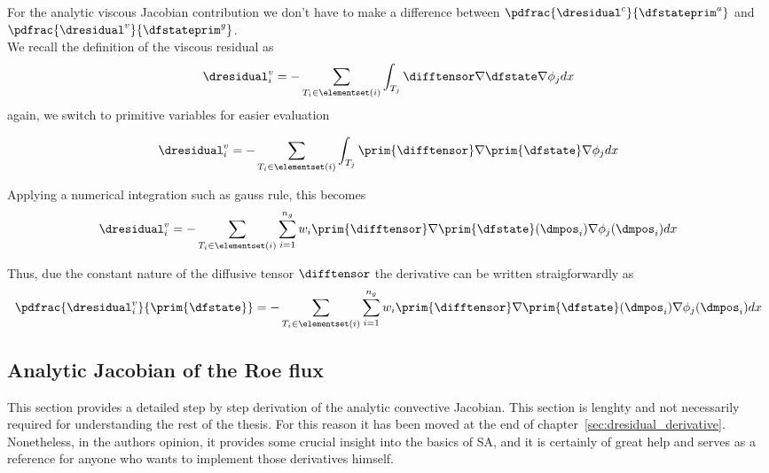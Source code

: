 \documentclass[../main.tex]{subfiles}
\begin{document}
For the analytic viscous Jacobian contribution we don't have to make a difference between $\pdfrac{\dresidual^c}{\dfstateprim^a}$ and $\pdfrac{\dresidual^v}{\dfstateprim^g}$.\\
We recall the definition of the viscous residual as
\begin{align}\label{eq:derivative_viscous_residual}
\dresidual_i^v=-\sum_{T_i \in \elementset(i)} \int_{T_j} \difftensor \nabla \dfstate \nabla \phi_j dx
\end{align}
again, we switch to primitive variables for easier evaluation

\begin{align}\label{eq:derivative_viscous_residual_primitives}
\dresidual_i^v=-\sum_{T_i \in \elementset(i)} \int_{T_j} \prim{\difftensor} \nabla \prim{\dfstate} \nabla \phi_j dx
\end{align}

Applying a numerical integration such as gauss rule, this becomes
\begin{align}\label{eq:aaa}
\dresidual_i^v=-\sum_{T_i \in \elementset(i)} \sum_{i=1}^{n_g} 
w_i \prim{\difftensor} \nabla \prim{\dfstate}(\dmpos_i) \nabla \phi_j(\dmpos_i) dx
\end{align}

Thus, due the constant nature of the diffusive tensor $\difftensor$ the derivative can be written straigforwardly as
\begin{align}\label{eq:aaa}
\pdfrac{\dresidual_i^v}{\prim{\dfstate}}=
-\sum_{T_i \in \elementset(i)} \sum_{i=1}^{n_g} 
w_i \prim{\difftensor} \nabla \prim{\dfstate}(\dmpos_i) \nabla \phi_j(\dmpos_i) dx
\end{align}




















\subsection{Analytic Jacobian of the Roe flux}\label{sec:jacobian_roeflux}

This section provides a detailed step by step derivation of the analytic convective Jacobian. This section is lenghty and not necessarily required for understanding the rest of the thesis. For this reason it has been moved at the end of chapter~\ref{sec:dresidual_derivative}. Nonetheless, in the authors opinion, it provides some crucial insight into the basics of \ac{SA}, and it is certainly of great help and serves as a reference for anyone who wants to implement those derivatives himself.
\end{document}

